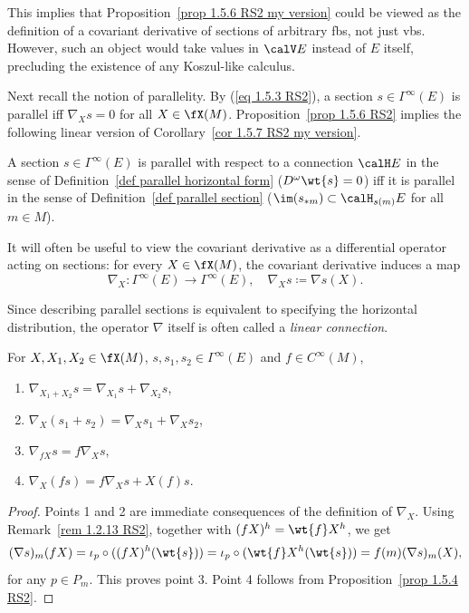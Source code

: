 \begin{rem}
    This implies that Proposition~\ref{prop 1.5.6 RS2 my version} could be viewed as the definition of a covariant derivative of sections of arbitrary \glspl{fb}, not just \glspl{vb}. However, such an object would take values in $\calV E$ instead of $E$ itself, precluding the existence of any Koszul-like calculus.
\end{rem}

Next recall the notion of parallelity. By (\ref{eq 1.5.3 RS2}), a section $s\in\Gamma^\infty(E)$ is parallel iff $\nabla_X s=0$ for all $X\in \fX(M)$. Proposition~\ref{prop 1.5.6 RS2} implies the following linear version of Corollary~\ref{cor 1.5.7 RS2 my version}.

\begin{cor}[{{\cite[Cor.~1.5.7]{RS2}}}]\label{cor 1.5.7 RS2}
    A section $s\in\Gamma^\infty(E)$ is parallel with respect to a connection $\calH E$ in the sense of Definition~\ref{def parallel horizontal form} ($D^\omega\wt{s}=0$) iff it is parallel in the sense of Definition~\ref{def parallel section} ($\im(s_{\ast m})\subset \calH_{s(m)}E$  for  all $m\in M$).
\end{cor}

It will often be useful to view the covariant derivative as a differential operator acting on sections: for every $X\in\fX(M)$, the covariant derivative induces a map
\[\nabla_X:\Gamma^\infty(E)\to \Gamma^\infty(E),\quad \nabla_X s\coloneqq \nabla s(X).\]

\begin{rem}
    Since describing parallel sections is equivalent to specifying the horizontal distribution, the operator $\nabla$ itself is often called a \emph{linear connection}.
\end{rem}

\begin{prop}[{{\cite[Prop.~1.5.8]{RS2}}}]\label{prop 1.5.8 RS2}
    For $X,X_1,X_2\in\fX(M)$, $s,s_1,s_2\in\Gamma^\infty(E)$ and $f\in C^\infty(M)$,
    \begin{enumerate}
        \item $\nabla_{X_1+X_2}s=\nabla_{X_1}s+\nabla_{X_2}s$,
        \item $\nabla_X(s_1+s_2)=\nabla_X s_1+\nabla_X s_2$,
        \item $\nabla_{fX}s=f\nabla_X s$,
        \item $\nabla_X(fs)=f\nabla_X s+X(f) s$.
    \end{enumerate}
\end{prop}
\begin{proof}
    Points 1 and 2 are immediate consequences of the definition of $\nabla_X$. Using Remark~\ref{rem 1.2.13 RS2}, together with $(fX)^h=\wt{f}X^h$, we get
    \[(\nabla s)_m(fX)=\iota_p\circ ((fX)^h(\wt{s}))=\iota_p\circ (\wt{f}X^h(\wt{s}))=f(m)(\nabla s)_m(X),\]
    for any $p\in P_m$. This proves point 3. Point 4 follows from Proposition~\ref{prop 1.5.4 RS2}.
\end{proof}


